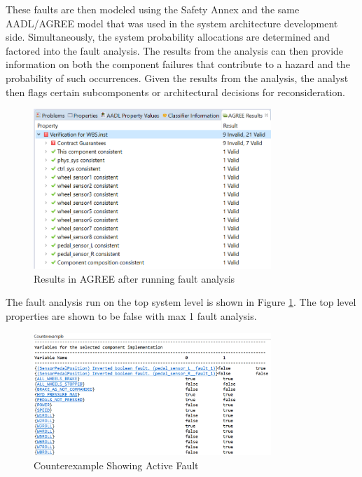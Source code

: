 These faults are then modeled using the Safety Annex and the same AADL/AGREE model that was used in the system architecture development side. Simultaneously, the system probability allocations are determined and factored into the fault analysis. The results from the analysis can then provide information on both the component failures that contribute to a hazard and the probability of such occurrences. Given the results from the analysis, the analyst then flags certain subcomponents or architectural decisions for reconsideration. 

\begin{figure}[h!]
	\vspace{-0.2in}
	\begin{center}
		\includegraphics[width=0.8\textwidth]{images/agreeResults.png}
	\end{center}
	\vspace{-0.3in}
	\caption{Results in AGREE after running fault analysis}
	\label{fig:agreeResults}
\end{figure}

The fault analysis run on the top system level is shown in Figure \ref{fig:agreeResults}. The top level properties are shown to be false with max 1 fault analysis. 

\begin{figure}[h!]
	\vspace{-0.2in}
	\begin{center}
		\includegraphics[width=0.8\textwidth]{images/pedalCoEx.png}
	\end{center}
	\vspace{-0.3in}
	\caption{Counterexample Showing Active Fault}
	\label{fig:coEx}
\end{figure}

